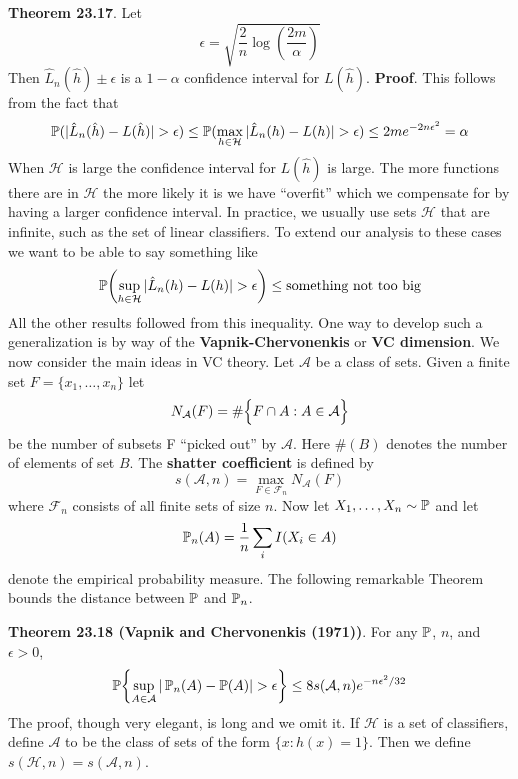 \textbf{Theorem 23.17}. Let
\[
\epsilon = \sqrt{\frac{2}{n} \log \left( \frac{2m}{\alpha} \right) }
\]
Then \(\hat{L}_{n}(\hat{h}) \pm \epsilon\) is a \(1 - \alpha\) confidence
interval for \(L(\hat{h})\).
\textbf{Proof}. This follows from the fact that
\[
\operatorname{\mathbb{P}}(|\hat{L}_{n}(\hat{h}) - L(\hat{h})| > \epsilon) 
\leq \operatorname{\mathbb{P}}( \max_{h \in \mathcal{H}} |\hat{L}_{n}(h) - L(h) | > \epsilon )
\leq 2 m e^{-2 n \epsilon^{2}} = \alpha
\]
When \(\mathcal{H}\) is large the confidence interval for \(L(\hat{h})\) is large. The more functions there are in \(\mathcal{H}\) the more likely it is we have ``overfit'' which we compensate for by having a larger confidence interval.
In practice, we usually use sets \(\mathcal{H}\) that are infinite, such as the set of linear classifiers. To extend our analysis to these cases we want to be able to say something like
\[
\PROB \left( \sup_{h \in \mathcal{H}} |\hat{L}_{n}(h) - L(h) | > \epsilon \right) \leq \text{something not too big}
\]
All the other results followed from this inequality. One way to develop such a generalization is by way of the \textbf{Vapnik-Chervonenkis} or \textbf{VC dimension}. We now consider the main ideas in VC theory.
Let \(\mathcal{A}\) be a class of sets. Given a finite set
\(F = \{ x_{1}, \dots, x_{n} \}\) let
\[
N_{\mathcal{A}}(F) = \# \Big\{ F \cap A : A \in \mathcal{A} \Big\}
\]
be the number of subsets F ``picked out'' by \(\mathcal{A}\). Here \(\#(B)\) denotes the number of elements of set \(B\). The \textbf{shatter coefficient} is defined by
\[
s(\mathcal{A}, n) = \max_{F \in \mathcal{F}_{n}} N_{\mathcal{A}}(F)
\]
where \(\mathcal{F}_{n}\) consists of all finite sets of size \(n\). Now
let \(X_{1}, \dots, X_{n} \sim \operatorname{\mathbb{P}}\) and let
\[
\operatorname{\mathbb{P}}_{n}(A) = \frac{1}{n} \sum_{i} I(X_{i} \in A)
\]
denote the empirical probability measure. The following remarkable
Theorem bounds the distance between \(\operatorname{\mathbb{P}}\) and \(\operatorname{\mathbb{P}}_{n}\).

\textbf{Theorem 23.18 (Vapnik and Chervonenkis (1971))}. For any
\(\operatorname{\mathbb{P}}\), \(n\), and \(\epsilon > 0\),
\[
\PROB \left\{ \sup_{A \in \mathcal{A}} | \PROB_{n}(A) - \PROB(A) | > \epsilon \right\} \leq 8 s(\mathcal{A}, n) e^{-n \epsilon^{2} / 32}
\]
The proof, though very elegant, is long and we omit it. If
\(\mathcal{H}\) is a set of classifiers, define \(\mathcal{A}\) to be
the class of sets of the form \(\{ x : h(x) = 1 \}\). Then we define
\(s(\mathcal{H}, n) = s(\mathcal{A}, n)\).


